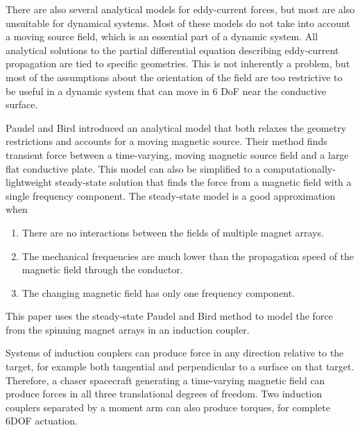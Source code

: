 \documentclass{article}
\begin{document}
There are also several analytical models for eddy-current forces, but most are also unsuitable for dynamical systems. Most of these models do not take into account a moving source field, which is an essential part of a dynamic system. All analytical solutions to the partial differential equation describing eddy-current propagation are tied to specific geometries. This is not inherently a problem, but most of the assumptions about the orientation of the field are too restrictive to be useful in a dynamic system that can move in 6 DoF near the conductive surface. 

Paudel and Bird introduced an analytical model that both relaxes the geometry restrictions and accounts for a moving magnetic source. Their method finds transient force between a time-varying, moving magnetic source field and a large flat conductive plate. \cite{Paudel2012t}
This model can also be simplified to a computationally-lightweight steady-state solution that finds the force from a magnetic field with a single frequency component. \cite{Paudel2012ss}
The steady-state model is a good approximation when 
\begin{enumerate}
\item There are no interactions between the fields of multiple magnet arrays. 
\item The mechanical frequencies are much lower than the propagation speed of the magnetic field through the conductor.
\item The changing magnetic field has only one frequency component.
\end{enumerate}
This paper uses the steady-state Paudel and Bird method to model the force from the spinning magnet arrays in an induction coupler. 
 
Systems of induction couplers can produce force in any direction relative to the target, for example both tangential and perpendicular to a surface on that target. Therefore, a chaser spacecraft generating a time-varying magnetic field can produce forces in all three translational degrees of freedom. Two induction couplers separated by a moment arm can also produce torques, for complete 6DOF actuation.
\end{document}
